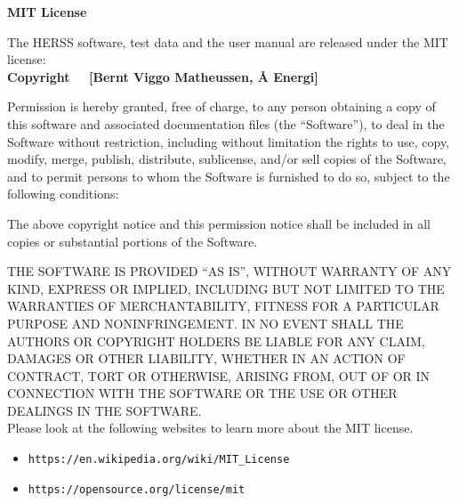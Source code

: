 \newpage
\thispagestyle{empty}
\vspace*{\fill}

\begin{center}
	\textbf{MIT License}
\end{center}

\vspace{1em}

The HERSS software, test data and the user manual are released under the MIT license: \\

\textbf{   
	Copyright \textcopyright\ \the\year\ [Bernt Viggo Matheussen, Å Energi]
}



\vspace{1em}

Permission is hereby granted, free of charge, to any person obtaining a copy
of this software and associated documentation files (the ``Software''), to deal
in the Software without restriction, including without limitation the rights
to use, copy, modify, merge, publish, distribute, sublicense, and/or sell
copies of the Software, and to permit persons to whom the Software is
furnished to do so, subject to the following conditions:

\vspace{1em}

The above copyright notice and this permission notice shall be included in all
copies or substantial portions of the Software.

\vspace{1em}

THE SOFTWARE IS PROVIDED ``AS IS'', WITHOUT WARRANTY OF ANY KIND, EXPRESS OR
IMPLIED, INCLUDING BUT NOT LIMITED TO THE WARRANTIES OF MERCHANTABILITY,
FITNESS FOR A PARTICULAR PURPOSE AND NONINFRINGEMENT. IN NO EVENT SHALL THE
AUTHORS OR COPYRIGHT HOLDERS BE LIABLE FOR ANY CLAIM, DAMAGES OR OTHER
LIABILITY, WHETHER IN AN ACTION OF CONTRACT, TORT OR OTHERWISE, ARISING FROM,
OUT OF OR IN CONNECTION WITH THE SOFTWARE OR THE USE OR OTHER DEALINGS IN THE
SOFTWARE. \\



Please look at the following websites to learn more about the MIT license.
\begin{itemize}
	\item \texttt{https://en.wikipedia.org/wiki/MIT\_License}
	\item \texttt{https://opensource.org/license/mit}
\end{itemize}



\vspace*{\fill}



\newpage
